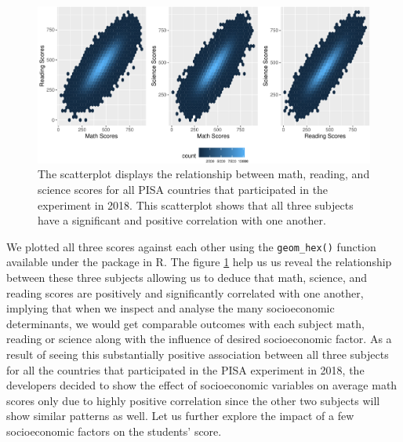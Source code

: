 \begin{Schunk}
\begin{figure}[H]
\includegraphics[width=1\linewidth]{learningtower_files/figure-latex/corr-plot-1} \caption[The scatterplot displays the relationship between math, reading, and science scores for all PISA countries that participated in the experiment in 2018]{The scatterplot displays the relationship between math, reading, and science scores for all PISA countries that participated in the experiment in 2018. This scatterplot shows that all three subjects have a significant and positive correlation with one another.}\label{fig:corr-plot}
\end{figure}
\end{Schunk}

We plotted all three scores against each other using the
\texttt{geom\_hex()} function available under the 
\citep{ggplot2} package in R. The figure \ref{fig:corr-plot} help us us
reveal the relationship between these three subjects allowing us to
deduce that math, science, and reading scores are positively and
significantly correlated with one another, implying that when we inspect
and analyse the many socioeconomic determinants, we would get comparable
outcomes with each subject math, reading or science along with the
influence of desired socioeconomic factor. As a result of seeing this
substantially positive association between all three subjects for all
the countries that participated in the PISA experiment in 2018, the
developers decided to show the effect of socioeconomic variables on
average math scores only due to highly positive correlation since the
other two subjects will show similar patterns as well. Let us further
explore the impact of a few socioeconomic factors on the students'
score.

